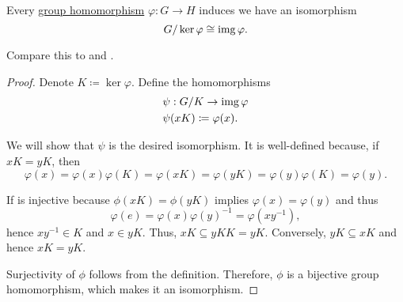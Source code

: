 \begin{theorem}\label{thm:homomorphism_theorem_for_groups}
  Every \hyperref[def:group/homomorphism]{group homomorphism} \( \varphi: G \to H \) induces we have an isomorphism
  \begin{equation*}
    G / \ker \varphi \cong \operatorname{img} \varphi.
  \end{equation*}

  Compare this to  and .
\end{theorem}
\begin{proof}
  Denote \( K \coloneqq \ker \varphi \). Define the homomorphisms
  \begin{align*}
    &\psi: G / K \to \operatorname{img} \varphi \\
    &\psi(xK) \coloneqq \varphi(x).
  \end{align*}

  We will show that \( \psi \) is the desired isomorphism. It is well-defined because, if \( xK = yK \), then
  \begin{equation*}
    \varphi(x)
    =
    \varphi(x) \varphi(K)
    =
    \varphi(xK)
    =
    \varphi(yK)
    =
    \varphi(y) \varphi(K)
    =
    \varphi(y).
  \end{equation*}

  If is injective because \( \phi(xK) = \phi(yK) \) implies \( \varphi(x) = \varphi(y) \) and thus
  \begin{equation*}
    \varphi(e)
    =
    \varphi(x) \varphi(y)^{-1}
    =
    \varphi(xy^{-1}),
  \end{equation*}
  hence \( xy^{-1} \in K \) and \( x \in yK \). Thus, \( xK \subseteq yKK = yK \). Conversely, \( yK \subseteq xK \) and hence \( xK = yK \).

  Surjectivity of \( \phi \) follows from the definition. Therefore, \( \phi \) is a bijective group homomorphism, which makes it an isomorphism.
\end{proof}
